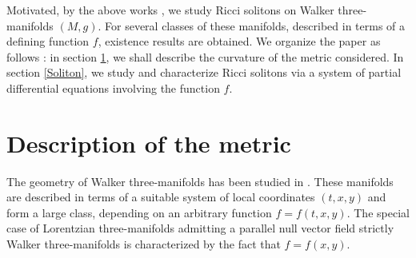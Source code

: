 \documentclass[reqno, 12pt]{amsart}
\numberwithin{equation}{section}
\begin{document}
Motivated, by the above works \cite{Brozos2012, CalvarusoDeLeo2011}, we study 
Ricci solitons on Walker three-manifolds $(M, g)$. For several classes of these
manifolds, described in terms of a deﬁning function $f$, existence results 
are obtained. We organize the paper as follows :  in section \ref{Description}, 
we shall describe the curvature of the metric considered. In section \ref{Soliton}, 
we study and characterize Ricci solitons via a system of partial differential 
equations involving the function $f$.



\section{Description of the metric}\label{Description}

The geometry of Walker three-manifolds  has been studied in \cite{Brozos2009}. 
These manifolds are described in terms of a suitable system of local coordinates 
$(t, x, y)$ and form a large class, depending on an arbitrary function 
$f = f (t, x, y)$. The special case of Lorentzian three-manifolds admitting 
a parallel null vector ﬁeld strictly Walker three-manifolds is characterized 
by the fact that $f = f (x, y)$. \\
\end{document}
